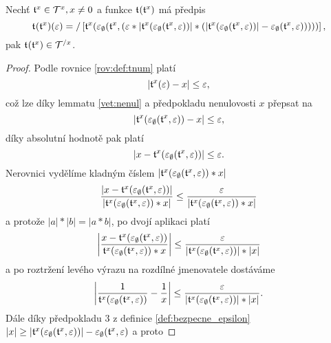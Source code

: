 \begin{theorem}\label{hyp:prevraceni_tnumu}
Nechť $\mathfrak{t}^{x}\in\mathcal{T}^{x},x\neq 0$ a funkce $\mathfrak{t}^{}(\mathfrak{t}^{x})$ má předpis
\begin{equation}
\mathfrak{t}^{}(\mathfrak{t}^{x})(\varepsilon)=/\left[\mathfrak{t}^{x}(\varepsilon_\emptyset(\mathfrak{t}^{x}, (\varepsilon*|\mathfrak{t}^{x}(\varepsilon_\emptyset(\mathfrak{t}^{x}, \varepsilon))|*(|\mathfrak{t}^{x}(\varepsilon_\emptyset(\mathfrak{t}^{x}, \varepsilon))|-\varepsilon_\emptyset(\mathfrak{t}^{x}, \varepsilon)))))\right],
\end{equation}
pak $\mathfrak{t}^{}(\mathfrak{t}^{x})\in\mathcal{T}^{/x}$.
\begin{proof}

Podle rovnice \eqref{rov:def:tnum} platí 
\begin{equation}
\left|\mathfrak{t}^{x}(\varepsilon)-x\right|\leq \varepsilon,
\end{equation}
což lze díky lemmatu \ref{vet:nenul} a předpokladu nenulovosti $x$ přepsat na
\begin{equation}
\left|\mathfrak{t}^{x}(\varepsilon_\emptyset(\mathfrak{t}^{x}, \varepsilon))-x\right|\leq \varepsilon,
\end{equation}
díky absolutní hodnotě pak platí
\begin{equation}
\left| x-\mathfrak{t}^{x}(\varepsilon_\emptyset(\mathfrak{t}^{x}, \varepsilon))\right|\leq \varepsilon.
\end{equation}
Nerovnici vydělíme kladným číslem $|\mathfrak{t}^{x}(\varepsilon_\emptyset(\mathfrak{t}^{x}, \varepsilon))*x|$
\begin{equation}
\frac{\left| x-\mathfrak{t}^{x}(\varepsilon_\emptyset(\mathfrak{t}^{x}, \varepsilon))\right|}{|\mathfrak{t}^{x}(\varepsilon_\emptyset(\mathfrak{t}^{x}, \varepsilon))*x|}\leq \frac{\varepsilon}{|\mathfrak{t}^{x}(\varepsilon_\emptyset(\mathfrak{t}^{x}, \varepsilon))*x|}
\end{equation}
a protože $|a|*|b|=|a*b|$, po dvojí aplikaci platí
\begin{equation}
\left|\frac{x-\mathfrak{t}^{x}(\varepsilon_\emptyset(\mathfrak{t}^{x}, \varepsilon))}{\mathfrak{t}^{x}(\varepsilon_\emptyset(\mathfrak{t}^{x}, \varepsilon))*x}\right|\leq \frac{\varepsilon}{|\mathfrak{t}^{x}(\varepsilon_\emptyset(\mathfrak{t}^{x}, \varepsilon))|*|x|}
\end{equation}
a po roztržení levého výrazu na rozdílné jmenovatele dostáváme
\begin{equation}
\left|\frac{1}{\mathfrak{t}^{x}(\varepsilon_\emptyset(\mathfrak{t}^{x}, \varepsilon))}-\frac{1}{x}\right|\leq \frac{\varepsilon}{|\mathfrak{t}^{x}(\varepsilon_\emptyset(\mathfrak{t}^{x}, \varepsilon))|*|x|}.
\end{equation}
Dále díky předpokladu $3$ z definice \ref{def:bezpecne_epsilon} $|x|\geq|\mathfrak{t}^{x}(\varepsilon_\emptyset(\mathfrak{t}^{x}, \varepsilon))|-\varepsilon_\emptyset(\mathfrak{t}^{x}, \varepsilon)$ a proto

\end{proof}
\end{theorem}
